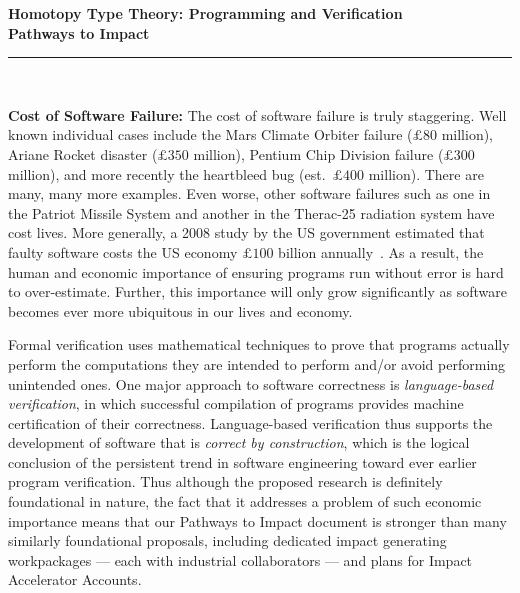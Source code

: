 \documentclass[a4paper,11pt]{article}
\begin{document}
\thispagestyle{plain}

\begin{center}

  {\Large {\bf Homotopy Type Theory: Programming and Verification \\
\vspace{0.2in} 
Pathways to Impact}}\\[1ex]   



\vspace*{-0.1in}



  \rule{150mm}{.5mm}\\[2ex]

\end{center}



\noindent



\vspace*{-0.1in}

{\bf Cost of Software Failure:} The cost of software failure is truly
staggering. Well known individual cases include the Mars Climate
Orbiter failure ($\pounds 80$ million), Ariane Rocket disaster
($\pounds 350$ million), Pentium Chip Division failure ($\pounds 300$
million), and more recently the heartbleed bug (est.\ $\pounds 400$
million).  There are many, many more examples. Even worse, other
software failures such as one in the Patriot Missile System and
another in the Therac-25 radiation system have cost lives. More
generally, a 2008 study by the US government estimated that faulty
software costs the US economy $\pounds 100$ billion annually~\cite{cnet08}.
As a result, the human and economic importance of ensuring programs
run without error is hard to over-estimate. Further, this importance
will only grow significantly as software becomes ever more ubiquitous
in our lives and economy.

Formal verification uses mathematical techniques to prove that
programs actually perform the computations they are intended to
perform and/or avoid performing unintended ones. One major approach to
software correctness is {\em language-based verification}, in which
successful compilation of programs provides machine certification of
their correctness. Language-based verification thus supports the
development of software that is {\em correct by construction}, which
is the logical conclusion of the persistent trend in software
engineering toward ever earlier program verification. Thus although
the proposed research is definitely foundational in nature, the fact
that it addresses a problem of such economic importance means that our
Pathways to Impact document is stronger than many similarly
foundational proposals, including dedicated impact generating
workpackages --- each with industrial collaborators --- and plans for
Impact Accelerator Accounts.
\end{document}
